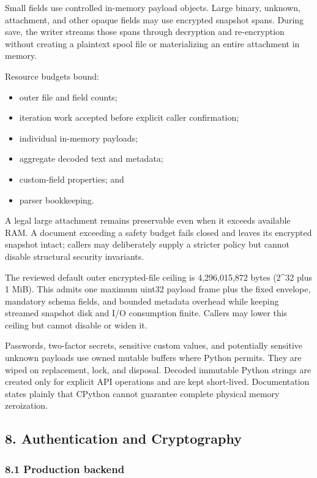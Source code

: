 \documentclass[
  letterpaper,
]{article}
\providecommand{\tightlist}{%
  \setlength{\itemsep}{0pt}\setlength{\parskip}{0pt}}
\begin{document}
Small fields use controlled in-memory payload objects. Large binary, unknown, attachment, and other opaque fields may
use encrypted snapshot spans. During save, the writer streams those spans through decryption and re-encryption without
creating a plaintext spool file or materializing an entire attachment in memory.

Resource budgets bound:

\begin{itemize}
\tightlist
\item
  outer file and field counts;
\item
  iteration work accepted before explicit caller confirmation;
\item
  individual in-memory payloads;
\item
  aggregate decoded text and metadata;
\item
  custom-field properties; and
\item
  parser bookkeeping.
\end{itemize}

A legal large attachment remains preservable even when it exceeds available RAM. A document exceeding a safety budget
fails closed and leaves its encrypted snapshot intact; callers may deliberately supply a stricter policy but cannot
disable structural security invariants.

The reviewed default outer encrypted-file ceiling is 4,296,015,872 bytes (2\^{}32 plus 1 MiB). This admits one maximum
uint32 payload frame plus the fixed envelope, mandatory schema fields, and bounded metadata overhead while keeping
streamed snapshot disk and I/O consumption finite. Callers may lower this ceiling but cannot disable or widen it.

Passwords, two-factor secrets, sensitive custom values, and potentially sensitive unknown payloads use owned mutable
buffers where Python permits. They are wiped on replacement, lock, and disposal. Decoded immutable Python strings are
created only for explicit API operations and are kept short-lived. Documentation states plainly that CPython cannot
guarantee complete physical memory zeroization.

\subsection{8. Authentication and Cryptography}\label{8-authentication-and-cryptography}

\subsubsection{8.1 Production backend}\label{81-production-backend}
\end{document}
